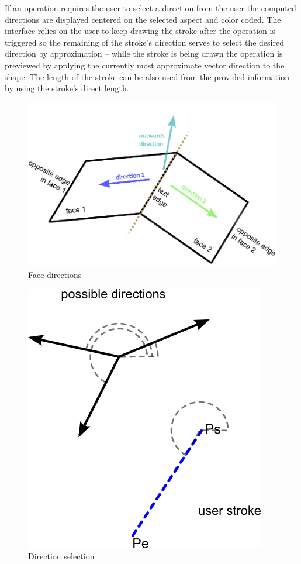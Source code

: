 If an operation requires the user to select a direction from the user the computed directions are displayed centered on the selected aspect
and color coded. The interface relies on the user to keep drawing the stroke after the operation is triggered so the remaining of the stroke's direction serves to select the desired direction by approximation -- while the stroke is being drawn the operation is previewed by applying the currently most approximate vector direction to the shape. The length of the stroke can be also used from the provided information by using the stroke's direct length.

\begin{figure}[ht]
	\centering
		\includegraphics[scale=0.6]{gfx/face-dirs.png}
	\caption{Face directions}
	\label{fig:face-dirs}
\end{figure}


\begin{figure}[ht]
	\centering
		\includegraphics[scale=0.6]{gfx/election.png}
	\caption{Direction selection}
	\label{fig:election}
\end{figure}




